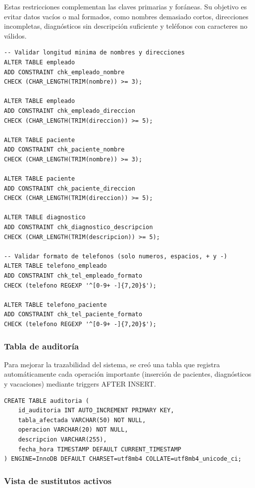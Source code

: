 \documentclass[12pt,a4paper]{article}
\begin{document}
Estas restricciones complementan las claves primarias y for\'aneas. Su objetivo es evitar datos vac\'ios o mal formados, como nombres demasiado cortos, direcciones incompletas, diagn\'osticos sin descripci\'on suficiente y tel\'efonos con caracteres no v\'alidos.

{\small\begin{verbatim}
-- Validar longitud minima de nombres y direcciones
ALTER TABLE empleado
ADD CONSTRAINT chk_empleado_nombre
CHECK (CHAR_LENGTH(TRIM(nombre)) >= 3);

ALTER TABLE empleado
ADD CONSTRAINT chk_empleado_direccion
CHECK (CHAR_LENGTH(TRIM(direccion)) >= 5);

ALTER TABLE paciente
ADD CONSTRAINT chk_paciente_nombre
CHECK (CHAR_LENGTH(TRIM(nombre)) >= 3);

ALTER TABLE paciente
ADD CONSTRAINT chk_paciente_direccion
CHECK (CHAR_LENGTH(TRIM(direccion)) >= 5);

ALTER TABLE diagnostico
ADD CONSTRAINT chk_diagnostico_descripcion
CHECK (CHAR_LENGTH(TRIM(descripcion)) >= 5);

-- Validar formato de telefonos (solo numeros, espacios, + y -)
ALTER TABLE telefono_empleado
ADD CONSTRAINT chk_tel_empleado_formato
CHECK (telefono REGEXP '^[0-9+ -]{7,20}$');

ALTER TABLE telefono_paciente
ADD CONSTRAINT chk_tel_paciente_formato
CHECK (telefono REGEXP '^[0-9+ -]{7,20}$');
\end{verbatim}}

\subsubsection{Tabla de auditor\'ia}

Para mejorar la trazabilidad del sistema, se cre\'o una tabla que registra autom\'aticamente cada operaci\'on importante (inserci\'on de pacientes, diagn\'osticos y vacaciones) mediante triggers AFTER INSERT.

{\small\begin{verbatim}
CREATE TABLE auditoria (
    id_auditoria INT AUTO_INCREMENT PRIMARY KEY,
    tabla_afectada VARCHAR(50) NOT NULL,
    operacion VARCHAR(20) NOT NULL,
    descripcion VARCHAR(255),
    fecha_hora TIMESTAMP DEFAULT CURRENT_TIMESTAMP
) ENGINE=InnoDB DEFAULT CHARSET=utf8mb4 COLLATE=utf8mb4_unicode_ci;
\end{verbatim}}

\subsubsection{Vista de sustitutos activos}
\end{document}
